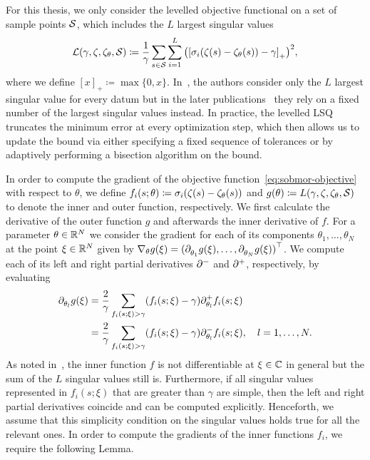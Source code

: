 For this thesis, we only consider the levelled objective functional on a set of sample points $\mcl{S}$, which includes the $L$ largest singular values
\begin{equation}\label{eq:sobmor-objective}
    \mcl{L}(\gamma, \tfunc, \tfunc_\theta, \mcl{S}) \coloneqq \frac{1}{\gamma} \sum\limits_{s \in \mcl{S}} \sum\limits_{i = 1}^L {\left( {[\sigma_i(\tfunc(s) - \tfunc_\theta(s)) - \gamma]}_+ \right)}^2,
\end{equation}
where we define ${[x]}_+ \coloneqq \max \{ 0, x \}$.
In~\cite{Schwerdtner2021, SV2021}, the authors consider only the $L$ largest singular value for every datum but in the later publications~\cite{Schwerdtner2023, SV2023} they rely on a fixed number of the largest singular values instead.
In practice, the levelled \ac{LSQ} truncates the minimum error at every optimization step, which then allows us to update the bound via either specifying a fixed sequence of tolerances or by adaptively performing a bisection algorithm on the bound.

In order to compute the gradient of the objective function~\eqref{eq:sobmor-objective} with respect to $\theta$, we define $f_i(s; \theta) \coloneqq \sigma_i(\tfunc(s) - \tfunc_\theta(s))$ and $g(\theta) \coloneqq L(\gamma, \tfunc, \tfunc_\theta, \mcl{S})$ to denote the inner and outer function, respectively.
We first calculate the derivative of the outer function $g$ and afterwards the inner derivative of $f$.
For a parameter $\theta \in \bb{R}^N$ we consider the gradient for each of its components $\theta_1, \dots, \theta_N$ at the point $\xi \in \bb{R}^N$ given by $\nabla_\theta g(\xi) = {(\pd[\theta_1]{} g(\xi), \dots, \pd[\theta_N]{} g(\xi))}\trans$.
We compute each of its left and right partial derivatives $\pd[]{-}$ and $\pd[]{+}$, respectively, by evaluating
\begin{equation}\label{eq:outer-sobmor-objective-gradient}
    \begin{alignedat}{1}
        \pd[\theta_l]{} g(\xi) &= \frac{2}{\gamma} \sum\limits_{f_i(s; \xi) > \gamma} (f_i(s; \xi) - \gamma) \pd[\theta_l]{+} f_i(s; \xi) \\
        &= \frac{2}{\gamma} \sum\limits_{f_i(s; \xi) > \gamma} (f_i(s; \xi) - \gamma) \pd[\theta_l]{-} f_i(s; \xi),\quad l = 1, \dots, N.
    \end{alignedat}
\end{equation}
As noted in~\cite[Remark~3.8]{SV2023}, the inner function $f$ is not differentiable at $\xi \in \bb{C}$ in general but the sum of the $L$ singular values still is.
Furthermore, if all singular values represented in $f_i(s; \xi)$ that are greater than $\gamma$ are simple, then the left and right partial derivatives coincide and can be computed explicitly.
Henceforth, we assume that this simplicity condition on the singular values holds true for all the relevant ones.
In order to compute the gradients of the inner functions $f_i$, we require the following Lemma.

